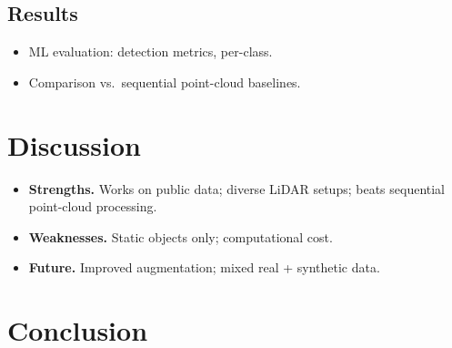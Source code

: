 \subsection{Results}
\begin{itemize}
    \item ML evaluation: detection metrics, per-class.
    \item Comparison vs.\ sequential point-cloud baselines.
\end{itemize}

\section{Discussion}
\label{sec:discussion}
\begin{itemize}
    \item \textbf{Strengths.} Works on public data; diverse LiDAR setups; beats
        sequential point-cloud processing.
    \item \textbf{Weaknesses.} Static objects only; computational cost.
    \item \textbf{Future.} Improved augmentation; mixed real + synthetic data.
\end{itemize}

\section{Conclusion}
\label{sec:conclusion}
